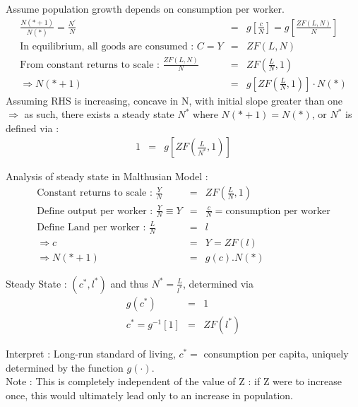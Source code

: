 Assume population growth depends on consumption per worker.\\
\begin{eqnarray*}
\frac{N(*+1)}{N(*)} = \frac{N^\prime}{N} &=& g \left[\frac{c}{N}\right] = g\left[\frac{ZF(L,N)}{N}\right]\\
\mbox{In equilibrium, all goods are consumed : } C = Y &=& Z F(L,N)\\
\mbox{From constant returns to scale : } \frac{ZF(L,N)}{N} &=& ZF \left(\frac{L}{N}, 1\right)\\
\Rightarrow N(* + 1 ) &=& g\left[ ZF \left(\frac{L}{N}, 1\right)\right]\cdot N(*)
\end{eqnarray*}
Assuming RHS is increasing, concave in N, with initial slope greater than one\\$\Rightarrow$ as such, there exists a steady state $N^*$ where $N(*+1) = N(*)$, or $N^*$ is defined via : 
\begin{eqnarray*}
1 &=& g\left[ ZF\left(\frac{L}{N^*}, 1\right)\right]
\end{eqnarray*}

Analysis of steady state in Malthusian Model :\\
\begin{eqnarray*}
\mbox{Constant returns to scale : } \frac{Y}{N} &=& ZF(\frac{L}{N}, 1)\\
\mbox{Define output per worker : } \frac{Y}{N} \equiv Y &=& \frac{c}{N} = \mbox{consumption per worker}\\
\mbox{Define Land per worker : } \frac{L}{N} &=& l\\
\Rightarrow c &=& Y = ZF(l)\\
\Rightarrow N(*+1) &=& g(c).N(*)
\end{eqnarray*}

Steady State : $(c^*, l^*)$ and thus $N^* = \frac{L}{l^*}$, determined via\\
\begin{eqnarray*}
g(c^*) &=& 1\\
c^* = g^{-1} [1] &=& ZF(l^*)
\end{eqnarray*}

Interpret : Long-run standard of living, $c^* = $ consumption per capita, uniquely determined by the function $g(\cdot)$.\\

Note : This is completely independent of the value of Z : if Z were to increase once, this would ultimately lead only to an increase in population.\\

